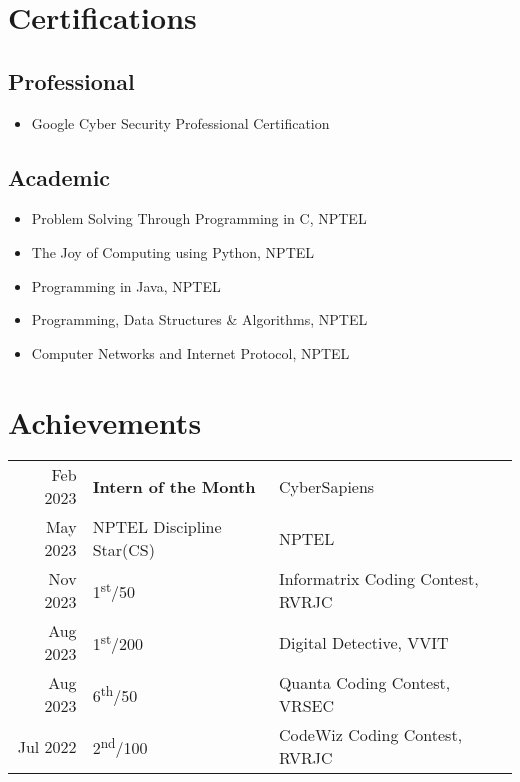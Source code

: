 \documentclass[]{roshan_resume}
\begin{document}
\begin{minipage}[t]{0.66\textwidth}
		\sectionsep
		
		\section{Certifications}
		\subsection{Professional}
		\begin{itemize}
			\item Google Cyber Security Professional Certification
		\end{itemize}
		
		\subsection{Academic}
		\begin{itemize}
			\item Problem Solving Through Programming in C, NPTEL\\
			\item The Joy of Computing using Python, NPTEL\\
			\item Programming in Java, NPTEL\\
			\item Programming, Data Structures \& Algorithms, NPTEL\\
			\item Computer Networks and Internet Protocol, NPTEL
		\end{itemize}
		
		
		
		\section{Achievements} 
		\begin{tabular}{rll}
			Feb 2023	     & \textbf{Intern of the Month}  & CyberSapiens\\
			May 2023         & NPTEL Discipline Star(CS) & NPTEL \\
			Nov 2023 		& 1\textsuperscript{st}/50 & Informatrix Coding Contest, RVRJC \\
			Aug 2023	     & 1\textsuperscript{st}/200  & Digital Detective, VVIT\\
			Aug 2023	     & 6\textsuperscript{th}/50  & Quanta Coding Contest, VRSEC\\
			Jul 2022     & 2\textsuperscript{nd}/100 & CodeWiz Coding Contest, RVRJC  \\
		\end{tabular}
		\sectionsep
		


\end{minipage}
\end{document}
